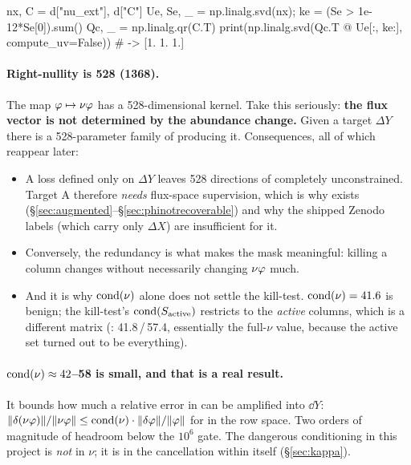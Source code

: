 \begin{srclisting}
nx, C = d["nu_ext"], d["C"]
Ue, Se, _ = np.linalg.svd(nx); ke = (Se > 1e-12*Se[0]).sum()
Qc, _ = np.linalg.qr(C.T)
print(np.linalg.svd(Qc.T @ Ue[:, ke:], compute_uv=False))   # -> [1. 1. 1.]
\end{srclisting}

\paragraph{Right-nullity is 528 (1368).} The map $\varphi \mapsto \nu\varphi$
has a 528-dimensional kernel. Take this seriously: \textbf{the flux vector is
not determined by the abundance change.} Given a target $\Delta Y$ there is a
528-parameter family of \netflux{} producing it. Consequences, all of which
reappear later:

\begin{itemize}
\item A loss defined only on $\Delta Y$ leaves 528 directions of \netflux{}
  completely unconstrained. Target A therefore \emph{needs} flux-space
  supervision, which is why  exists
  (\S\ref{sec:augmented}--\S\ref{sec:phinotrecoverable}) and why the shipped
  Zenodo labels (which carry only $\Delta X$) are insufficient for it.
\item Conversely, the redundancy is what makes the mask meaningful: killing a
  column changes \netflux{} without necessarily changing $\nu\varphi$ much.
\item And it is why $\operatorname{cond}(\nu)$ alone does not settle the kill-test.
  $\operatorname{cond}(\nu) = 41.6$ is benign; the kill-test's $\operatorname{cond}(S_{\mathrm{active}})$ restricts to the
  \emph{active} columns, which is a different matrix (:
  41.8\,/\,57.4, essentially the full-$\nu$ value, because the active set turned
  out to be everything).
\end{itemize}

\paragraph{$\operatorname{cond}(\nu) \approx 42$--58 is small, and that is a real result.} It
bounds how much a relative error in \netflux{} can be amplified into $\dd Y$:
$\|\delta(\nu\varphi)\|/\|\nu\varphi\| \le
\operatorname{cond}(\nu)\cdot\|\delta\varphi\|/\|\varphi\|$ for \netflux{} in the row space.
Two orders of magnitude of headroom below the $10^{6}$ gate. The dangerous
conditioning in this project is \emph{not} in $\nu$; it is in the cancellation
within \netflux{} itself (\S\ref{sec:kappa}).

